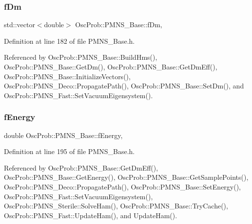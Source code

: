\subsubsection{\texorpdfstring{f\+Dm}{fDm}}
{\footnotesize\ttfamily std\+::vector$<$double$>$ Osc\+Prob\+::\+P\+M\+N\+S\+\_\+\+Base\+::f\+Dm\hspace{0.3cm}{\ttfamily [protected]}, {\ttfamily [inherited]}}



Definition at line 182 of file P\+M\+N\+S\+\_\+\+Base.\+h.



Referenced by Osc\+Prob\+::\+P\+M\+N\+S\+\_\+\+Base\+::\+Build\+Hms(), Osc\+Prob\+::\+P\+M\+N\+S\+\_\+\+Base\+::\+Get\+Dm(), Osc\+Prob\+::\+P\+M\+N\+S\+\_\+\+Base\+::\+Get\+Dm\+Eff(), Osc\+Prob\+::\+P\+M\+N\+S\+\_\+\+Base\+::\+Initialize\+Vectors(), Osc\+Prob\+::\+P\+M\+N\+S\+\_\+\+Deco\+::\+Propagate\+Path(), Osc\+Prob\+::\+P\+M\+N\+S\+\_\+\+Base\+::\+Set\+Dm(), and Osc\+Prob\+::\+P\+M\+N\+S\+\_\+\+Fast\+::\+Set\+Vacuum\+Eigensystem().

\mbox{\label{classOscProb_1_1PMNS__Base_a2800af6d436972f3e900867790c046b0}} 
\subsubsection{\texorpdfstring{f\+Energy}{fEnergy}}
{\footnotesize\ttfamily double Osc\+Prob\+::\+P\+M\+N\+S\+\_\+\+Base\+::f\+Energy\hspace{0.3cm}{\ttfamily [protected]}, {\ttfamily [inherited]}}



Definition at line 195 of file P\+M\+N\+S\+\_\+\+Base.\+h.



Referenced by Osc\+Prob\+::\+P\+M\+N\+S\+\_\+\+Base\+::\+Get\+Dm\+Eff(), Osc\+Prob\+::\+P\+M\+N\+S\+\_\+\+Base\+::\+Get\+Energy(), Osc\+Prob\+::\+P\+M\+N\+S\+\_\+\+Base\+::\+Get\+Sample\+Points(), Osc\+Prob\+::\+P\+M\+N\+S\+\_\+\+Deco\+::\+Propagate\+Path(), Osc\+Prob\+::\+P\+M\+N\+S\+\_\+\+Base\+::\+Set\+Energy(), Osc\+Prob\+::\+P\+M\+N\+S\+\_\+\+Fast\+::\+Set\+Vacuum\+Eigensystem(), Osc\+Prob\+::\+P\+M\+N\+S\+\_\+\+Sterile\+::\+Solve\+Ham(), Osc\+Prob\+::\+P\+M\+N\+S\+\_\+\+Base\+::\+Try\+Cache(), Osc\+Prob\+::\+P\+M\+N\+S\+\_\+\+Fast\+::\+Update\+Ham(), and Update\+Ham().

